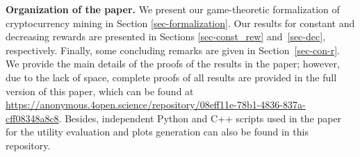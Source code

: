 
\smallskip
\noindent
{\bf Organization of the paper.} We present our game-theoretic formalization of cryptocurrency mining in Section \ref{sec-formalization}. Our results for constant and decreasing rewards are presented in Sections \ref{sec-const_rew} and~\ref{sec-dec}, respectively. Finally, some concluding remarks are given in Section~\ref{sec-con-r}. We provide the main details of the proofs of the results in the paper; however, due to the lack of space, complete proofs of all results are provided in the full version of this paper, which can be found at \url{https://anonymous.4open.science/repository/08eff11e-78b1-4836-837a-cff08348a8c8}. Besides, independent Python and C++ scripts used in the paper for the utility evaluation and plots generation can also be found in this repository.




